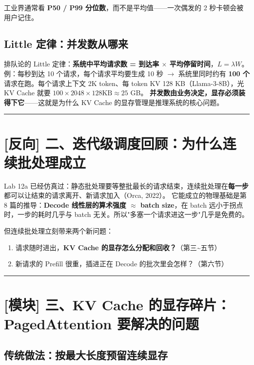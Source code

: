 工业界通常看 \textbf{P50 / P99 分位数}，而不是平均值——一次偶发的 2 秒卡顿会被用户记住。

\subsection{Little 定律：并发数从哪来}

排队论的 Little 定律：\textbf{系统中平均请求数 = 到达率 $\times$ 平均停留时间}，$L = \lambda W$。
例：每秒到达 10 个请求，每个请求平均要生成 10 秒 $\rightarrow$ 系统里同时约有 \textbf{100 个}请求在跑。每个请求上下文 2K token、每 token KV 128 KB（Llama-3-8B），光 KV Cache 就要 $100 \times 2048 \times 128\text{KB} \approx 25$ GB。
\textbf{并发数由业务决定，显存必须装得下它}——这就是为什么 KV Cache 的显存管理是推理系统的核心问题。

\vspace{0.8em}\hrule\vspace{0.8em}

\section{[反向] 二、迭代级调度回顾：为什么连续批处理成立}

Lab 12a 已经仿真过：静态批处理要等整批最长的请求结束，连续批处理在\textbf{每一步}都可以让结束的请求离开、新请求加入（Orca, 2022）。
它能成立的物理基础是第 8 篇的推导：\textbf{Decode 线性层的算术强度 $\approx$ batch size}，在 batch 远小于拐点时，一步的耗时几乎与 batch 无关。所以"多塞一个请求进这一步"几乎是免费的。

但连续批处理立刻带来两个新问题：
\begin{enumerate}
  \item 请求随时进出，\textbf{KV Cache 的显存怎么分配和回收？}（第三\textasciitilde{}五节）
  \item 新请求的 Prefill 很重，插进正在 Decode 的批次里会怎样？（第六节）
\end{enumerate}

\vspace{0.8em}\hrule\vspace{0.8em}

\section{[模块] 三、KV Cache 的显存碎片：PagedAttention 要解决的问题}

\subsection{传统做法：按最大长度预留连续显存}

